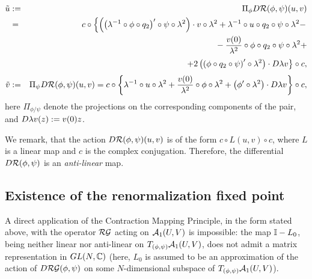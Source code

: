 \begin{eqnarray}
\nonumber \tilde{u}&:=&\Pi_\phi D \cR(\phi,\psi) (u,v)\\
\nonumber &=& c \circ \left\{\left( \left(\lambda^{-1} \circ \phi \circ q_2 \right)' \circ \psi \circ \lambda^2 \right) \cdot v \circ  \lambda^2 + \lambda^{-1} \circ u \circ q_2 \circ \psi \circ \lambda^2 -\right.\\
\nonumber  &\phantom{=}& \phantom{c \circ \left.\left( \left(\lambda^{-1} \circ \phi \circ q_2 \right)' \circ \psi \circ \lambda^2 \right) \cdot v \circ  \lambda^2  \ \right.} -  {v(0) \over \lambda^2} \circ \phi \circ q_2 \circ \psi \circ \lambda^2  + \\
\nonumber  &\phantom{=}& \phantom{c \circ \left.\left( \left(\lambda^{-1} \circ \phi \circ q_2 \right)' \circ \psi \circ \lambda^2 \right) \cdot v \circ  \lambda^2 \  \right. }  \left. + 2 \left(\left( \phi \circ q_2 \circ \psi \right)' \circ \lambda^2  \right) \cdot D \la v \right\} \circ c, \\
\nonumber \tilde{v}&:=&\Pi_\psi   D \cR(\phi,\psi) (u,v)= c \circ \left\{ \lambda^{-1} \circ u \circ \lambda^2+{v(0) \over \lambda^2} \circ \phi \circ \lambda^2 +\left( \phi' \circ \lambda^2\right) \cdot D \la v \right\}  \circ c,
\end{eqnarray}
here $\Pi_{\phi/\psi}$ denote the projections on the corresponding components of the pair, and  $D \lambda v(z):=v(0) z$.


We remark, that the action $D \mathcal{R}(\phi,\psi)(u,v)$ is of the form $c \circ L (u,v) \circ c$, where $L$ is a linear map and $c$ is the complex conjugation. Therefore, the differential $ D \mathcal{R}(\phi,\psi)$ is an {{\it anti-linear}} map.



\subsection{Existence of the renormalization fixed point}

A direct application of the Contraction Mapping Principle, in the form stated above, with the operator $\mathcal{RG}$ acting on $\mathcal{A}_1(U,V)$ is impossible: the map $\mathbb{I} - L_0$, being neither linear nor anti-linear on $T_{(\phi,\psi)}\mathcal{A}_1(U,V)$, does not admit a matrix representation in $GL(N,\mathbb{C})$ (here, $L_0$ is assumed to be an approximation of the action of $D \mathcal{RG}(\phi,\psi)$ on some $N$-dimensional subspace of  $T_{(\phi,\psi)}\mathcal{A}_1(U,V)$).

